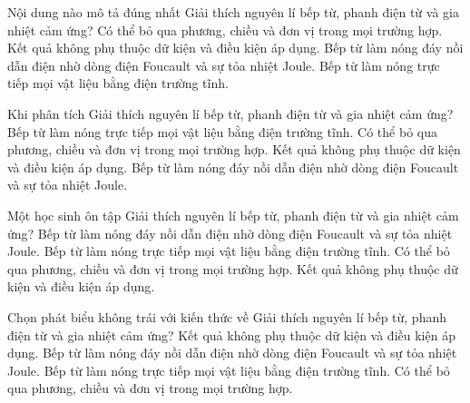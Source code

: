 \begin{ex}
Nội dung nào mô tả đúng nhất Giải thích nguyên lí bếp từ, phanh điện từ và gia nhiệt cảm ứng?
\choice
{Có thể bỏ qua phương, chiều và đơn vị trong mọi trường hợp.}
{Kết quả không phụ thuộc dữ kiện và điều kiện áp dụng.}
{\True Bếp từ làm nóng đáy nồi dẫn điện nhờ dòng điện Foucault và sự tỏa nhiệt Joule.}
{Bếp từ làm nóng trực tiếp mọi vật liệu bằng điện trường tĩnh.}
\end{ex}

\begin{ex}
Khi phân tích Giải thích nguyên lí bếp từ, phanh điện từ và gia nhiệt cảm ứng?
\choice
{Bếp từ làm nóng trực tiếp mọi vật liệu bằng điện trường tĩnh.}
{Có thể bỏ qua phương, chiều và đơn vị trong mọi trường hợp.}
{Kết quả không phụ thuộc dữ kiện và điều kiện áp dụng.}
{\True Bếp từ làm nóng đáy nồi dẫn điện nhờ dòng điện Foucault và sự tỏa nhiệt Joule.}
\end{ex}

\begin{ex}
Một học sinh ôn tập Giải thích nguyên lí bếp từ, phanh điện từ và gia nhiệt cảm ứng?
\choice
{\True Bếp từ làm nóng đáy nồi dẫn điện nhờ dòng điện Foucault và sự tỏa nhiệt Joule.}
{Bếp từ làm nóng trực tiếp mọi vật liệu bằng điện trường tĩnh.}
{Có thể bỏ qua phương, chiều và đơn vị trong mọi trường hợp.}
{Kết quả không phụ thuộc dữ kiện và điều kiện áp dụng.}
\end{ex}

\begin{ex}
Chọn phát biểu không trái với kiến thức về Giải thích nguyên lí bếp từ, phanh điện từ và gia nhiệt cảm ứng?
\choice
{Kết quả không phụ thuộc dữ kiện và điều kiện áp dụng.}
{\True Bếp từ làm nóng đáy nồi dẫn điện nhờ dòng điện Foucault và sự tỏa nhiệt Joule.}
{Bếp từ làm nóng trực tiếp mọi vật liệu bằng điện trường tĩnh.}
{Có thể bỏ qua phương, chiều và đơn vị trong mọi trường hợp.}
\end{ex}

